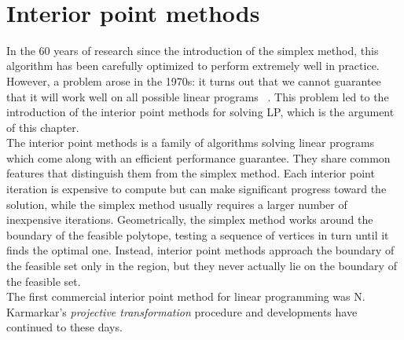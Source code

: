 \documentclass[a4paper,10 pt,titlepage,twoside]{book}
\theoremstyle{plain}
\theoremstyle{definition}
\theoremstyle{remark}
\begin{document}
\\


\chapter{Interior point methods}
In the 60 years of research since the introduction of the simplex method, this algorithm has been carefully optimized to perform extremely well in practice. However, a problem arose in the 1970s: it turns out that we cannot guarantee that it will work well on all possible linear programs ~\cite{3}.
This problem led to the introduction of the interior point methods for solving LP, which is the argument of this chapter.\\The interior point methods is a family of algorithms solving linear programs which come along with an efficient performance guarantee. They share common features that distinguish them from the simplex method. Each interior point iteration is expensive to compute but can make significant progress toward the solution, while the simplex method usually requires a larger number of inexpensive iterations. Geometrically, the simplex method works around the boundary of the feasible polytope, testing a sequence of vertices in turn until it finds the optimal one. Instead, interior point methods approach the boundary of the feasible set only in the region, but they never actually lie on the boundary of the feasible set.\\
The first commercial interior point method for linear programming was N. Karmarkar's  \textit{projective transformation} procedure \cite{Kar} and developments have continued to these days. 
\end{document}
